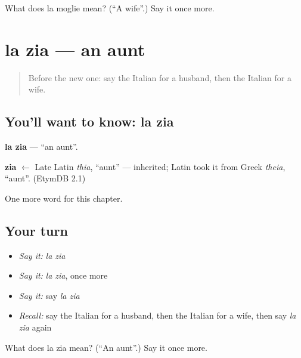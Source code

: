 \begin{tcolorbox}[breakable,colback=teal!4,colframe=teal!35!black,title={Before you move on}]
What does la moglie mean? (\textquotedblleft{}A wife\textquotedblright{}.) Say it once more.
\end{tcolorbox}
\section[la zia]{la zia — an aunt}

\label{lesson:IT-C45-zia}



\begin{quote}
Before the new one: say the Italian for a husband, then the Italian for a wife.
\end{quote}

\subsection*{You'll want to know: la zia}
\textbf{la zia} — \textquotedblleft{}an aunt\textquotedblright{}.

\begin{cousinweb}
\textbf{zia} $\leftarrow$ Late Latin \emph{thia}, \textquotedblleft{}aunt\textquotedblright{} — inherited; Latin took it from Greek \emph{theia}, \textquotedblleft{}aunt\textquotedblright{}. (EtymDB 2.1)
\end{cousinweb}

\begin{grammarlens}[title={What you've built}]
One more word for this chapter.
\end{grammarlens}

\subsection*{Your turn}
\begin{itemize}
\raggedright
  \item \emph{Say it:} \emph{la zia}
  \item \emph{Say it:} \emph{la zia}, once more
  \item \emph{Say it:} say \emph{la zia}
  \item \emph{Recall:} say the Italian for a husband, then the Italian for a wife, then say \emph{la zia} again
\end{itemize}

\begin{tcolorbox}[breakable,colback=teal!4,colframe=teal!35!black,title={Before you move on}]
What does la zia mean? (\textquotedblleft{}An aunt\textquotedblright{}.) Say it once more.
\end{tcolorbox}
